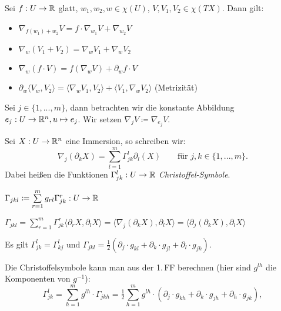\documentclass{cheat-sheet}
\begin{document}
\begin{satz}
  Sei $f : U \to \mathbb{R}$ glatt, $w_1, w_2, w \in \chi(U)$, $V, V_1, V_2 \in \chi(TX)$. Dann gilt:
  \begin{itemize}
    \item $\nabla_{f(w_1) + w_2} V = f \cdot \nabla_{w_1} V + \nabla_{w_2} V$
    \item $\nabla_w (V_1 + V_2) = \nabla_w V_1 + \nabla_w V_2$
    \item $\nabla_w (f \cdot V) = f (\nabla_w V) + \partial_w f \cdot V $
    \item $\partial_w \langle V_w, V_2 \rangle = \langle \nabla_w V_1 , V_2 \rangle + \langle V_1 , \nabla_w V_2 \rangle$ (Metrizität)
  \end{itemize}
\end{satz}

\begin{nota}
  Sei $j \in \{1, ..., m\}$, dann betrachten wir die konstante Abbildung $e_j : U \to \mathbb{R}^n, u \mapsto e_j$. Wir setzen $\nabla_j V \coloneqq \nabla_{e_j} V$.
\end{nota}

\begin{definition}
  Sei $X : U \to \mathbb{R}^n$ eine Immersion, so schreiben wir:
  \[ \nabla_j (\partial_k X) = \sum_{l=1}^m \Gamma_{jk}^l \partial_l (X)  \qquad \text{für $j,k \in \{ 1, ..., m \}$.} \]
  Dabei heißen die Funktionen $\Gamma_{jk}^l : U \to \mathbb{R}$ \emph{Christoffel-Symbole}.
\end{definition}

\begin{nota}
  $\Gamma_{jkl} \coloneqq \sum_{r=1}^m g_{rl} \Gamma_{jk}^r : U \to \R$
\end{nota}

\begin{satz}
  $\Gamma_{jkl}\!=\!\sum_{r=1}^m \Gamma_{jk}^{r} \langle \partial_r X, \partial_l X \rangle\!=\!\langle \nabla_j (\partial_k X), \partial_l X \rangle\!=\!\langle \partial_j (\partial_k X), \partial_l X \rangle$
\end{satz}

\begin{satz}
    Es gilt $\Gamma_{jk}^l = \Gamma_{kj}^l \,\, \text{und} \,\, \Gamma_{jkl} = \tfrac{1}{2} (\partial_j \cdot g_{kl} + \partial_k \cdot g_{jl} + \partial_l \cdot g_{jk})$.
\end{satz}

\begin{bem}
  Die Christoffelsymbole kann man aus der 1.\,FF berechnen (hier sind $g^{lh}$ die Komponenten von $g^{-1}$):
  \[
    \Gamma_{jk}^l = \sum_{h=1}^m g^{lh} \cdot \Gamma_{jkh} 
    = \tfrac{1}{2} \sum_{h=1}^m g^{lh} \cdot (\partial_j \cdot g_{kh} + \partial_k \cdot g_{jh} + \partial_h \cdot g_{jk}),
  \]
\end{bem}
\end{document}
